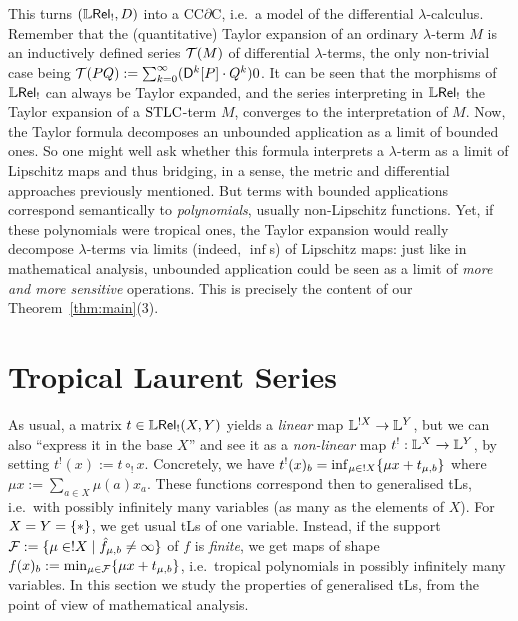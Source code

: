 \documentclass[submission,%
]{eptcs}
\begin{document}
This turns $(\mathbb{L} \mathsf{Rel}_!,D)$ into a CC$\partial$C, i.e.\ a model of the differential $\lambda$-calculus.
Remember that the (quantitative) Taylor expansion of an ordinary $\lambda$-term $M$ is an inductively defined series $\mathcal{T}(M)$ of differential $\lambda$-terms, the only non-trivial case being $\mathcal{T}(PQ) :=  \sum_{k=0}^{\infty} (\mathsf{D}^{k}[P] \cdot Q^{k})0$.
It can be seen that the morphisms of $\mathbb{L} \mathsf{Rel}_!$ can always be Taylor expanded, and the series interpreting in $\mathbb{L} \mathsf{Rel}_!$ the Taylor expansion of a $\mathrm{STLC}$-term $M$, converges to the interpretation of $M$.
Now, the Taylor formula decomposes an unbounded application as a limit of bounded ones.
So one might well ask whether this formula interprets a $\lambda$-term 
as a limit of Lipschitz maps and thus bridging, in a sense, the metric and differential approaches previously mentioned.  
But terms with bounded applications correspond semantically to \emph{polynomials}, usually non-Lipschitz functions. 
Yet, if these polynomials were tropical ones, the Taylor expansion would really decompose $\lambda$-terms via limits (indeed, $\inf$s) of Lipschitz maps: just like in mathematical analysis, unbounded application could be seen 
as a limit of \emph{more and more sensitive} operations.
This is precisely the content of our Theorem~\ref{thm:main}(3).

\section{Tropical Laurent Series}

 As usual, a matrix $t\in{\mathbb{L}\mathsf{Rel}_!}(X,Y)$ yields a \emph{linear} map $\mathbb{L}^{!X}\to\mathbb{L}^Y$, but we can also ``express it in the base $X$'' and see it as a \emph{non-linear} map $t^!:\mathbb{L}^X\to\mathbb{L}^Y$, by setting 
 $t^!(x):=t\circ_! x$.
 Concretely, we have $t^!(x)_b=\inf_{\mu\in !X} \{\mu x+ t_{\mu,b}\}$
 where $\mu x:=\sum_{a\in X} \mu(a)x_a$.
 These functions correspond then to generalised tLs, i.e.\ with possibly infinitely many variables (as many as the elements of $X$).
For $X=Y=\{*\}$, we get usual tLs of one variable.
Instead, if the support $\mathcal{F}:=\{\mu\in!X\mid\hat{f}_{\mu,b}\neq\infty\}$ of $f$ is \emph{finite}, we get maps of shape $f(x)_b:=\min_{\mu\in\mathcal{F}} \{\mu x+ t_{\mu,b}\}$, i.e.\ tropical polynomials in possibly infinitely many variables.
In this section we study the properties of generalised tLs, from the point of view of mathematical analysis.
 
\end{document}
